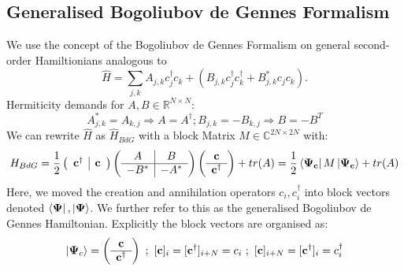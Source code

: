 \documentclass[Master]{subfiles}
\begin{document}
\subsection{Generalised Bogoliubov de Gennes Formalism}
\label{sec:BdG}
We use the concept of the Bogoliubov de Gennes Formalism on general second-order Hamiltionians analogous to \cite{blaizot1986quantum}
$$\hat{H} = \sum_{j,k} A_{j,k}c^{\dag}_{j}c_{k} +  (B_{j,k} c^{\dag}_{j}c^{\dag}_{k} + B_{j,k}^* c_{j}c_{k}) \text{.}$$
Hermiticity demands for $A,B \in \mathbb{R}^{N\times N}$:
$$ A_{j,k}^* =A_{k,j} \Rightarrow A = A^{\dag} ; B_{j,k} =-B_{k,j} \Rightarrow B = -B^{T}$$
We can rewrite $\hat{H}$ as  $\hat{H}_{BdG}$ with a block Matrix $M \in \mathbb{C}^{2N\times 2N}$ with:
\begin{dmath}\label{math:GeneralizedBdGHamiltonian}
H_{BdG} = 
\frac{1}{2}
\left(
\begin{array}{c|c}
\vec{c}^{\dag} & \vec{c} 
\end{array}
\right)
\left(
\begin{array}{c|c}
A & B \\
\hline
- B^* & -A^*
\end{array}
\right)
\left(
\begin{array}{c}
\vec{c} \\
\hline
\vec{c}^{\dag}
\end{array}
\right) + tr(A) = \frac{1}{2}\bra{\vec{\Psi_c}}M\ket{\vec{\Psi_c}} + tr(A)
\end{dmath}
Here, we moved the creation and annihilation operators $c_i,c_i^{\dag}$ into block vectors denoted $\bra{\mathbf{\Psi}},\ket{\mathbf{\Psi}}$.
We further refer to this as the generalised Bogoliubov de Gennes Hamiltonian.
Explicitly the block vectors are organised as:
$$
\ket{\vec{\Psi}_c} = \left(\begin{array}{c}
       \vec{c}\\
       \hline
        \vec{c}^{\dag}
\end{array}\right) \ ; \ [\vec{c}]_i =[\vec{c}^{\dag}]_{i+N} = c_i \ ; \ [\vec{c}]_{i+N}= [\vec{c}^{\dag}]_i = c^{\dag}_i  
$$
\end{document}
